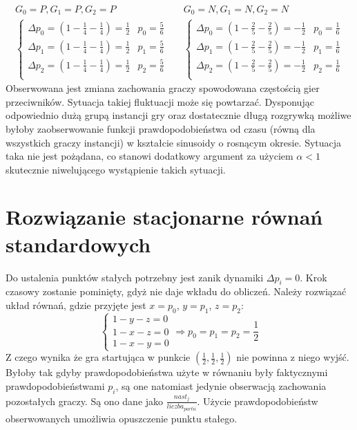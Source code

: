 \begin{align*}
G_0 = P, G_1 = P, G_2 = P && G_0 = N, G_1 = N, G_2 = N \\
\left\{
\begin{array}{cc}
\Delta p_0 = (1 - \frac{1}{4} - \frac{1}{4}) =  \frac{1}{2} & p_0= \frac{5}{6}\\
\Delta p_1 = (1 - \frac{1}{4} - \frac{1}{4}) =  \frac{1}{2} & p_1= \frac{5}{6}\\
\Delta p_2 = (1 - \frac{1}{4} - \frac{1}{4}) =  \frac{1}{2} & p_2= \frac{5}{6}\\
\end{array} 
\right. &&
\left\{
\begin{array}{cc}
\Delta p_0 = (1 - \frac{2}{5} - \frac{2}{5}) =  -\frac{1}{2} & p_0= \frac{1}{6}\\
\Delta p_1 = (1 - \frac{2}{5} - \frac{2}{5}) =  -\frac{1}{2} & p_1= \frac{1}{6}\\
\Delta p_2 = (1 - \frac{2}{5} - \frac{2}{5}) =  -\frac{1}{2} & p_2= \frac{1}{6}\\
\end{array}
\right.
\end{align*}
Obserwowana jest zmiana zachowania graczy spowodowana częstością gier przeciwników. Sytuacja takiej fluktuacji może się powtarzać. Dysponując odpowiednio dużą grupą instancji gry oraz dostatecznie długą rozgrywką możliwe byłoby zaobserwowanie funkcji prawdopodobieństwa od czasu (równą dla wszystkich graczy instancji) w kształcie sinusoidy o rosnącym okresie.
Sytuacja taka nie jest pożądana, co stanowi dodatkowy argument za użyciem $\alpha < 1$ skutecznie niwelującego wystąpienie takich sytuacji.

\section{Rozwiązanie stacjonarne równań standardowych}
\label{sec:stab_stand}
Do ustalenia punktów stałych potrzebny jest zanik dynamiki $\Delta p_i = 0$. Krok czasowy zostanie pominięty, gdyż nie daje wkładu do obliczeń. Należy rozwiązać układ równań, gdzie przyjęte jest $x=p_0$, $y=p_1$, $z=p_2$:
\begin{equation}
\left\{
\begin{array}{c}
1 - y - z = 0 \\
1 - x - z = 0 \\
1 - x - y = 0
\end{array}
\right. \Rightarrow p_0 = p_1 = p_2 = \frac{1}{2}
\end{equation}
Z czego wynika że gra startująca w punkcie $(\frac{1}{2},\frac{1}{2},\frac{1}{2})$ nie powinna z niego wyjść. Byłoby tak gdyby prawdopodobieństwa użyte w równaniu były faktycznymi prawdopodobieństwami $p_i$, są one natomiast jedynie obserwacją zachowania pozostałych graczy. Są ono dane jako $\frac{nast_j}{liczba_{partii}}$. Użycie prawdopodobieństw obserwowanych umożliwia opuszczenie punktu stałego.
